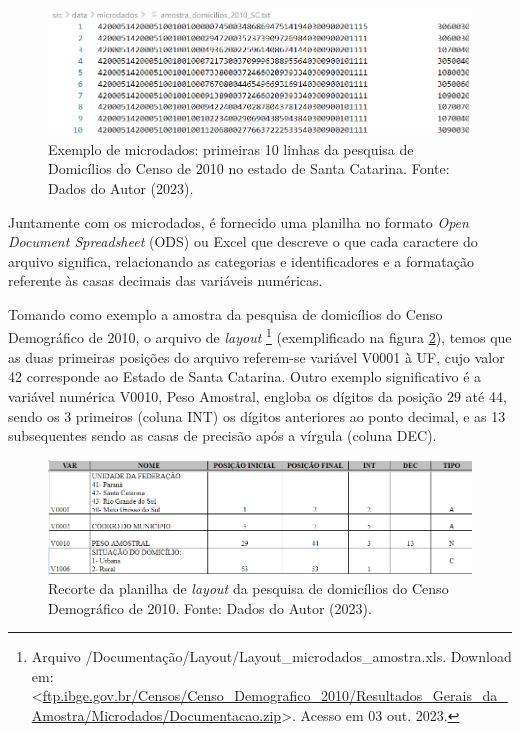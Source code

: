 \begin{figure}[ht]
    \centering
    \includegraphics[width=\textwidth]{files/img/exemplo_microdado.png}
    \caption{Exemplo de microdados: primeiras 10 linhas da pesquisa de Domicílios do Censo de 2010 no estado de Santa Catarina. Fonte: Dados do Autor (2023)\protect\footnotemark.}
    \label{fig:exemplo-microdado}
\end{figure}

    Juntamente com os microdados, é fornecido uma planilha no formato \textit{Open Document Spreadsheet} (ODS) ou Excel que descreve o que cada caractere do arquivo significa, relacionando as categorias e identificadores e a formatação referente às casas decimais das variáveis numéricas. 
    
    Tomando como exemplo a amostra da pesquisa de domicílios do Censo Demográfico de 2010, o arquivo de \textit{layout}
    \footnote{Arquivo /Documentação/Layout/Layout\_microdados\_amostra.xls. Download em: <\url{ftp.ibge.gov.br/Censos/Censo_Demografico_2010/Resultados_Gerais_da_Amostra/Microdados/Documentacao.zip}>. Acesso em 03 out. 2023.} (exemplificado na figura \ref{fig:layout-domi}), temos que as duas primeiras posições do arquivo referem-se variável V0001 à UF, cujo valor 42 corresponde ao Estado de Santa Catarina. Outro exemplo significativo é a variável numérica V0010, Peso Amostral, engloba os dígitos da posição 29 até 44, sendo os 3 primeiros (coluna INT) os dígitos anteriores ao ponto decimal, e as 13 subsequentes sendo as casas de precisão após a vírgula (coluna DEC).

\begin{figure}[ht]
    \centering
    \includegraphics[width=\textwidth]{files/img/layout amostra domicilios 2010.png}
    \caption{Recorte da planilha de \textit{layout} da pesquisa de domicílios do Censo Demográfico de 2010. Fonte: Dados do Autor (2023)\protect\footnotemark.}
    \label{fig:layout-domi}
\end{figure}

